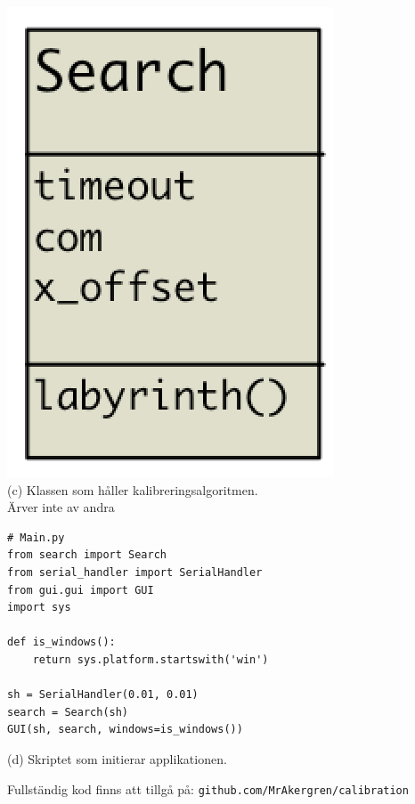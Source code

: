 \begin{minipage}[l]{0.49\textwidth}
    \vspace*{2em}
    \centering
        \includegraphics[scale=0.25]{res/img/search_uml} \\
        \vspace*{3.7em}
        (c) Klassen som håller kalibreringsalgoritmen. \\ Ärver inte av andra
\end{minipage}
\begin{minipage}[l]{0.49\textwidth}
    \vspace{-3.5em}
        \begin{verbatim}
# Main.py
from search import Search
from serial_handler import SerialHandler
from gui.gui import GUI
import sys

def is_windows():
    return sys.platform.startswith('win')

sh = SerialHandler(0.01, 0.01)
search = Search(sh)
GUI(sh, search, windows=is_windows())
\end{verbatim}
        \centering
        (d) Skriptet som initierar applikationen.
\end{minipage}

\vfill\centering
Fullständig kod finns att tillgå på: \texttt{github.com/MrAkergren/calibration}
